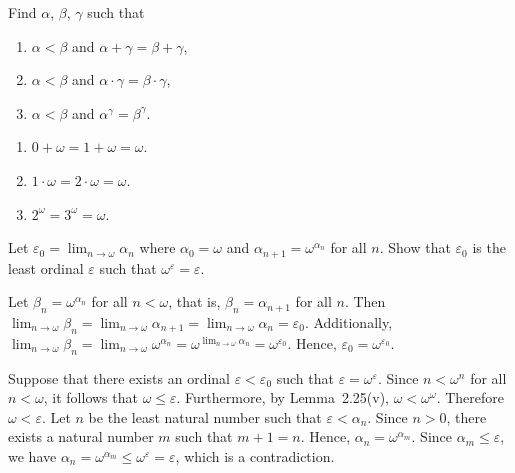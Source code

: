  Find $\alpha$, $\beta$, $\gamma$ such that
\begin{enumerate}[label=(\roman*)]
\item 
$\alpha < \beta$ and $\alpha + \gamma = \beta + \gamma$,
\item 
$\alpha < \beta$ and $\alpha \cdot \gamma = \beta \cdot \gamma$,
\item 
$\alpha < \beta$ and $\alpha^{\gamma} = \beta^{\gamma}$.
\end{enumerate}
\begin{solution}
\begin{enumerate}[label=(\roman*)]
\item
$0 + \omega = 1 + \omega = \omega$.
\item
$1 \cdot \omega = 2 \cdot \omega = \omega$.
\item
$2^\omega = 3^\omega = \omega$.
\end{enumerate}
\end{solution}

 Let $\varepsilon_0 = \lim_{n \rightarrow \omega} \alpha_n$ where 
$\alpha_0 = \omega$ and $\alpha_{n + 1} = \omega^{\alpha_n}$ for all $n$. Show 
that $\varepsilon_0$ is the least ordinal $\varepsilon$ such that 
$\omega^\varepsilon = \varepsilon$.
\begin{solution}
Let $\beta_n = \omega^{\alpha_n}$ for all $n < \omega$, that is, 
$\beta_n = \alpha_{n + 1}$ for all $n$. Then 
$\lim_{n \rightarrow \omega} \beta_n = \lim_{n \rightarrow \omega} 
\alpha_{n + 1} = \lim_{n \rightarrow \omega} \alpha_n = \varepsilon_0$. 
Additionally, $\lim_{n \rightarrow \omega} \beta_n = \lim_{n \rightarrow 
\omega} \omega^{\alpha_n} = \omega^{\lim_{n \rightarrow \omega} \alpha_n} = 
\omega^{\varepsilon_0}$. Hence, $\varepsilon_0 = \omega^{\varepsilon_0}$.

Suppose that there exists an ordinal $\varepsilon < \varepsilon_0$ such that 
$\varepsilon = \omega^\varepsilon$. Since $n < \omega^n$ for all $n < \omega$, 
it follows that $\omega \leq \varepsilon$. Furthermore, by Lemma~2.25(v), 
$\omega < \omega^\omega$. Therefore $\omega < \varepsilon$. Let $n$ be the 
least natural number such that $\varepsilon < \alpha_n$. Since $n > 0$, there 
exists a natural number $m$ such that $m + 1 = n$. Hence, 
$\alpha_n = \omega^{\alpha_m}$. Since $\alpha_m \leq \varepsilon$, we have 
$\alpha_n = \omega^{\alpha_m} \leq \omega^\varepsilon = \varepsilon$, 
which is a contradiction.
\end{solution}